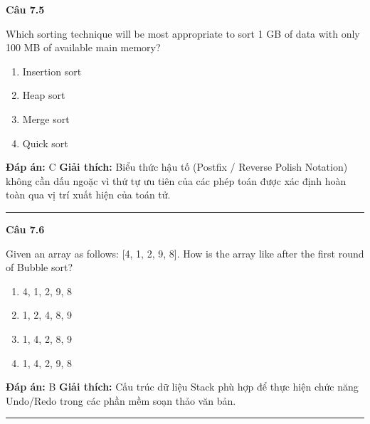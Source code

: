 \documentclass[11pt,a4paper]{article}
\newenvironment{question}[1]{%
  \par\vspace{1em}\noindent\textbf{\large Câu #1}\par\vspace{0.4em}
}{%
  \par\vspace{1em}\hrule\vspace{0.6em}
}
\newenvironment{choices}{%
  \begin{enumerate}[label=\textbf{\Alph*.},leftmargin=2.2em,itemsep=2pt,topsep=3pt]
}{%
  \end{enumerate}
}
\newcommand{\choice}{\item}
\begin{document}
\begin{question}{7.5}
Which sorting technique will be most appropriate to sort 1 GB of data with only 100 MB of available main memory?
\begin{choices}
\choice Insertion sort
\choice Heap sort
\choice Merge sort
\choice Quick sort
\end{choices}
\textbf{Đáp án:} C
\textbf{Giải thích:} Biểu thức hậu tố (Postfix / Reverse Polish Notation) không cần dấu ngoặc vì thứ tự ưu tiên của các phép toán được xác định hoàn toàn qua vị trí xuất hiện của toán tử.
\end{question}

\begin{question}{7.6}
Given an array as follows: [4, 1, 2, 9, 8]. How is the array like after the first round of Bubble sort?
\begin{choices}
\choice 4, 1, 2, 9, 8
\choice 1, 2, 4, 8, 9
\choice 1, 4, 2, 8, 9
\choice 1, 4, 2, 9, 8
\end{choices}
\textbf{Đáp án:} B
\textbf{Giải thích:} Cấu trúc dữ liệu Stack phù hợp để thực hiện chức năng Undo/Redo trong các phần mềm soạn thảo văn bản.
\end{question}
\end{document}
